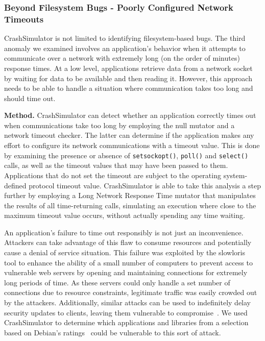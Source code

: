 \subsubsection{Beyond Filesystem Bugs - Poorly Configured Network Timeouts}
\label{sec-timeout-bugs}

CrashSimulator is not limited
to identifying filesystem-based bugs.
The third anomaly we examined
involves an application's behavior
when it attempts to communicate
over a network with extremely long
(on the order of minutes) response times.
At a low level,
applications retrieve data from a network socket
by waiting for data to be available and then reading it.
However,
this approach needs to be able to handle
a situation where communication
takes too long and should time out.

{\bf Method.}
CrashSimulator can detect
whether an application correctly times out when communications
take too long
by employing the null mutator and a network timeout checker. The latter
can determine if the application makes any effort
to configure its network communications with a timeout value.
This is done by examining the presence or absence of {\tt setsockopt()}, {\tt poll()}
and {\tt select()} calls, as well as the timeout values that may
have been passed to them. Applications that do not set the timeout are
subject to the operating system-defined protocol timeout value.
CrashSimulator is able to take this analysis a step further by employing a Long Network Response Time mutator
that manipulates
the results of all time-returning calls,
simulating an execution where close to the maximum timeout value occurs,
without actually spending any time waiting.

An application's failure
to time out responsibly
is not just an inconvenience. Attackers can take advantage of this flaw
to consume resources and potentially cause a denial of service situation.
This failure was exploited by the slowloris~\cite{Slowloris} tool
to enhance the ability
of a small number of computers to prevent access
to vulnerable web servers
by opening and maintaining connections
for extremely long periods of time.
As these servers could only handle a set number of connections
due to resource constraints,
legitimate traffic was easily crowded out by the attackers.
Additionally, similar attacks can be used to
indefinitely delay security updates to
clients, leaving them vulnerable to compromise~\cite{Cappos_TR_08}.
We used CrashSimulator to determine which applications and
libraries from a selection based on Debian's ratings~\cite{DebPopCon}
could be vulnerable to this sort of attack.

